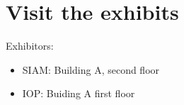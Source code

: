 \section*{Visit the exhibits}
Exhibitors:
\begin{itemize}
  \item SIAM: Building A, second floor
  \item IOP: Buiding A first floor
\end{itemize}
